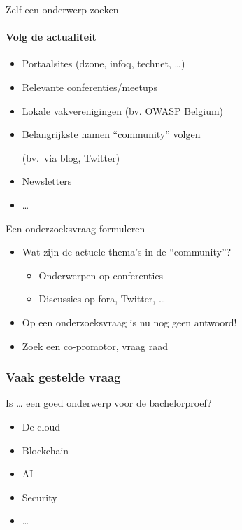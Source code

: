 \documentclass[aspectratio=169]{beamer}
\begin{document}
\begin{frame}{Zelf een onderwerp zoeken}
  \framesubtitle{Volg de actualiteit}

  \begin{itemize}
    \item Portaalsites (dzone, infoq, technet, \ldots)
    \item Relevante conferenties/meetups
    \item Lokale vakverenigingen (bv. OWASP Belgium)
    \item Belangrijkste namen ``community'' volgen

          (bv.\ via blog, Twitter)

    \item Newsletters
    \item \ldots
  \end{itemize}

\end{frame}

\begin{frame}{Een onderzoeksvraag formuleren}

  \begin{itemize}
    \item Wat zijn de actuele thema's in de ``community''?
          \begin{itemize}
            \item Onderwerpen op conferenties
            \item Discussies op fora, Twitter, \ldots
          \end{itemize}
    \item Op een onderzoeksvraag is nu nog geen antwoord!
    \item Zoek een co-promotor, vraag raad
  \end{itemize}

\end{frame}

\begin{frame}[plain]
  \frametitle{Vaak gestelde vraag}

  Is \ldots{} een goed onderwerp voor de bachelorproef?

  \begin{itemize}
    \item De cloud
    \item Blockchain
    \item AI
    \item Security
    \item \ldots
  \end{itemize}

  \bigskip

\end{frame}
\end{document}
